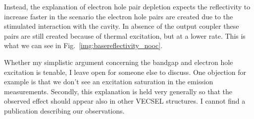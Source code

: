 Instead,
the explanation
of electron hole pair depletion
expects the reflectivity
to increase faster
in the scenario
the electron hole pairs
are created
due to the stimulated interaction
with the cavity.
In absence of the output coupler
these pairs are still created
because of thermal excitation,
but at a lower rate.
This is what we can see
in Fig.~\ref{img:basereflectivity_nooc}.

Whether my simplistic argument
concerning the bandgap
and electron hole excitation
is tenable,
I leave open
for someone else to discuss.
One objection for example
is that we don't see
an excitation saturation
in the emission measurements.
Secondly,
this explanation
is held very generally
so that
the observed effect
should  appear also in other
VECSEL structures.
I cannot find a publication
describing our observations.

